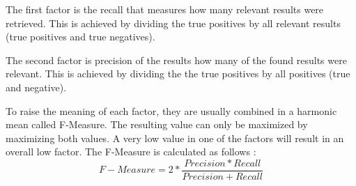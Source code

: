 The first factor is the recall that measures how many relevant results were retrieved. 
This is achieved by dividing the true positives by all relevant results (true positives and true negatives).

The second factor is precision of the results how many of the found results were relevant. 
This is achieved by dividing the the true positives by all positives (true and negative).

To raise the meaning of each factor, they are usually combined in a harmonic mean called F-Measure. 
The resulting value can only be maximized by maximizing both values. 
A very low value in one of the factors will result in an overall low factor. 
The F-Measure is calculated as follows \cite{f_measure}: 
\[
F-Measure = 2*\frac{Precision*Recall}{Precision+Recall}
\]


